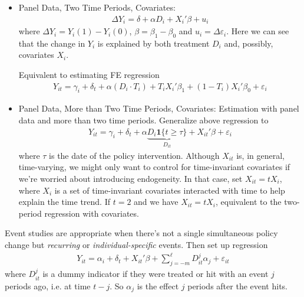 \documentclass[12pt]{article}
\theoremstyle{plain}
\theoremstyle{definition}
\theoremstyle{remark}
\begin{document}
\begin{itemize}
\begin{itemize}
      \item Panel Data, Two Time Periods, Covariates:
        \begin{align*}
          \Delta Y_i = \delta + \alpha D_i + X_i'\beta + u_i
        \end{align*}
        where $\Delta Y_i=Y_i(1)-Y_i(0)$, $\beta=\beta_1-\beta_0$
        and $u_i=\Delta \varepsilon_i$.
        Here we can see that the change in $Y_i$ is explained by both
        treatment $D_i$ and, possibly, covariates $X_i$.

        Equivalent to estimating FE regression
        \begin{align*}
          Y_{it} = \gamma_i + \delta_t + \alpha (D_i\cdot T_i)
          + T_i X_i'\beta_1
          + (1-T_i) X_i'\beta_0
          + \varepsilon_i
        \end{align*}

      \item Panel Data, More than Two Time Periods, Covariates:
        Estimation with panel data and more than two time periods.
        Generalize above regression to
        \begin{align*}
          Y_{it}
          =
          \gamma_i
          + \delta_t
          + \alpha \underbrace{D_i\mathbf{1}\{t\geq \tau\}}_{D_{it}}
          + {X_{it}'}\beta
          + \varepsilon_i
        \end{align*}
        where $\tau$ is the date of the policy intervention.
        Although $X_{it}$ is, in general, time-varying, we might only want
        to control for time-invariant covariates if we're worried about
        introducing endogeneity.
        In that case, set $X_{it}=tX_i$, where $X_i$ is a set of
        time-invariant covariates interacted with time to help explain the
        time trend.
        If $t=2$ and we have $X_{it}=tX_i$, equivalent to the two-period
        regression with covariates.
    \end{itemize}
\end{itemize}
Event studies are appropriate when there's not a single simultaneous
policy change but \emph{recurring} or \emph{individual-specific} events.
Then set up regression
\begin{align*}
  Y_{it}
  =
  \alpha_i + \delta_t
  + X_{it}'\beta
  + \sum_{j=-m}^\ell D_{it}^j \alpha_j + \varepsilon_{it}
\end{align*}
where $D_{it}^j$ is a dummy indicator if they were treated or hit with
an event $j$ periods ago, i.e. at time $t-j$.
So $\alpha_j$ is the effect $j$ periods after the event hits.
\end{document}
